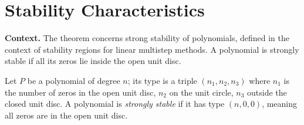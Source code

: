 \section{Stability Characteristics}

\noindent\textbf{Context.}
The theorem concerns strong stability of polynomials, defined in the context of stability regions for linear multistep methods. A polynomial is strongly stable if all its zeros lie inside the open unit disc.

Let $P$ be a polynomial of degree $n$; its type is a triple $(n_{1}, n_{2}, n_{3})$ where $n_{1}$ is the number of zeros in the open unit disc, $n_{2}$ on the unit circle, $n_{3}$ outside the closed unit disc. A polynomial is \emph{strongly stable} if it has type $(n, 0, 0)$, meaning all zeros are in the open unit disc.

